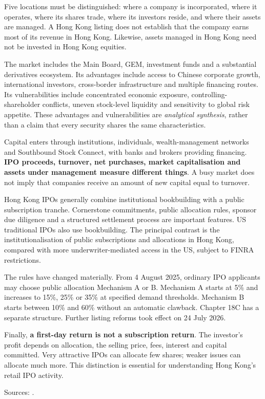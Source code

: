 \documentclass[11pt,a4paper]{article}
\newcommand{\source}[1]{\par{\footnotesize\color{ink}Sources: \cite{#1}.}\par}
\begin{document}
Five locations must be distinguished: where a company is incorporated, where it operates, where its shares trade, where its investors reside, and where their assets are managed. A Hong Kong listing does not establish that the company earns most of its revenue in Hong Kong. Likewise, assets managed in Hong Kong need not be invested in Hong Kong equities.

The market includes the Main Board, GEM, investment funds and a substantial derivatives ecosystem. Its advantages include access to Chinese corporate growth, international investors, cross-border infrastructure and multiple financing routes. Its vulnerabilities include concentrated economic exposure, controlling-shareholder conflicts, uneven stock-level liquidity and sensitivity to global risk appetite. These advantages and vulnerabilities are \textit{analytical synthesis}, rather than a claim that every security shares the same characteristics.

Capital enters through institutions, individuals, wealth-management networks and Southbound Stock Connect, with banks and brokers providing financing. \textbf{IPO proceeds, turnover, net purchases, market capitalisation and assets under management measure different things}. A busy market does not imply that companies receive an amount of new capital equal to turnover.

Hong Kong IPOs generally combine institutional bookbuilding with a public subscription tranche. Cornerstone commitments, public allocation rules, sponsor due diligence and a structured settlement process are important features. US traditional IPOs also use bookbuilding. The principal contrast is the institutionalisation of public subscriptions and allocations in Hong Kong, compared with more underwriter-mediated access in the US, subject to FINRA restrictions.

The rules have changed materially. From 4 August 2025, ordinary IPO applicants may choose public allocation Mechanism A or B. Mechanism A starts at 5\% and increases to 15\%, 25\% or 35\% at specified demand thresholds. Mechanism B starts between 10\% and 60\% without an automatic clawback. Chapter 18C has a separate structure. Further listing reforms took effect on 24 July 2026.

Finally, \textbf{a first-day return is not a subscription return}. The investor's profit depends on allocation, the selling price, fees, interest and capital committed. Very attractive IPOs can allocate few shares; weaker issues can allocate much more. This distinction is essential for understanding Hong Kong's retail IPO activity.
\source{ipo2025,compet2026,ifecipo}
\end{document}
